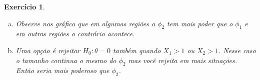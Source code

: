 \documentclass[letter,11pt]{article}
\newtheorem{exer}{Exercício}
\begin{document}
\begin{exer}
\begin{enumerate}[a)]
 
\[\beta_2(\theta)=P_\theta(X_1+X_2>C)
=\begin{cases}
0 & \mbox{ se } \theta \leq C/2-1\\
 (2\theta +2-C)^2/2 & \mbox{ se } C/2-1 < \theta \leq (C-1)/2\\
 1-(C-2\theta)^2/2 & \mbox{ se } (C-1)/2< \theta \leq C/2\\
 0 & \mbox{ se } C/2<\theta.
\end{cases}\]

Assuma que C=1.68 e faça os gráficos.


\item  Observe nos gráfico que em algumas regiões o $\phi_2$   tem mais poder que o $\phi_1$ e em outras regiões o contrário acontece.

\item %

Uma opção é rejeitar $H_0:\theta=0$ também quando $X_1>1$ ou $X_2> 1$. Nesse caso o tamanho continua o mesmo do $\phi_2$ mas você rejeita em mais situações. Então seria mais poderoso que $\phi_2$.


\end{enumerate}
\end{exer}


% 
% 
% 
\end{document}
